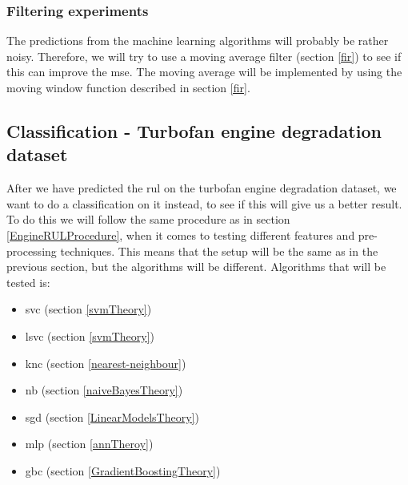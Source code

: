 \documentclass[english, a4paper]{report}
\begin{document}
{{{            \subsubsection{Filtering experiments}
            {
                The predictions from the machine learning algorithms will probably be rather noisy. Therefore, we will try to use a moving average filter (section \ref{fir}) to see if this can improve the \gls{mse}. The moving average will be implemented by using the moving window function described in section \ref{fir}.
            }
        }
        
        \subsection{Classification - Turbofan engine degradation dataset} \label{classificationTurbofan}
        {
            After we have predicted the \acrfull{rul} on the turbofan engine degradation dataset, we want to do a classification on it instead, to see if this will give us a better result. To do this we will follow the same procedure as in section \ref{EngineRULProcedure}, when it comes to testing different features and pre-processing techniques. This means that the setup will be the same as in the previous section, but the algorithms will be different. Algorithms that will be tested is: 
            
            \begin{itemize}
                \item \gls{svc} (section \ref{svmTheory})
                \item \gls{lsvc} (section \ref{svmTheory})
                \item \acrfull{knc} (section \ref{nearest-neighbour})
                \item \gls{nb} (section \ref{naiveBayesTheory})
                \item \gls{sgd} (section \ref{LinearModelsTheory})
                \item \acrfull{mlp} (section \ref{annTheroy})
                \item \acrfull{gbc} (section \ref{GradientBoostingTheory})
            \end{itemize}
            
}}}
\end{document}
